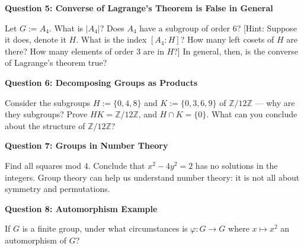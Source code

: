 \documentclass[11pt,twoside, a4paper]{report}
\theoremstyle{plain}
\theoremstyle{definition}
\begin{document}
  
\begin{center}
{\bf Question 5: Converse of Lagrange's Theorem is False in General}
\end{center}
Let $G:=A_{4}$. What is $|A_{4}|$? Does $A_{4}$ have a subgroup of order 6? [Hint: Suppose it does, denote it $H$. What is the index $[A_{4}:H]$? How many left cosets of $H$ are there? How many elements of order 3 are in $H$?] In general, then, is the converse of Lagrange's theorem true?

  
\begin{center}
{\bf Question 6: Decomposing Groups as Products}
\end{center}

Consider the subgroups $H:=\{0,4,8\}$ and $K:=\{0,3,6,9\}$ of $\mathbb{Z}/12\mathbb{Z}$ --- why are they subgroups? Prove $HK=\mathbb{Z}/12\mathbb{Z}$, and $H\cap K = \{0\}$. What can you conclude about the structure of $\mathbb{Z}/12\mathbb{Z}$?

  
\begin{center}
{\bf Question 7: Groups in Number Theory}
\end{center}

Find all squares mod $4$. Conclude that $x^{2} - 4y^{2} = 2$ has no solutions in the integers. Group theory can help us understand number theory: it is not all about symmetry and permutations. 

  
\begin{center}
{\bf Question 8: Automorphism Example}
\end{center}

If $G$ is a finite group, under what circumstances is $\varphi: G \rightarrow G$ where $x\mapsto x^{2}$ an automorphism of $G$?
\end{document}
